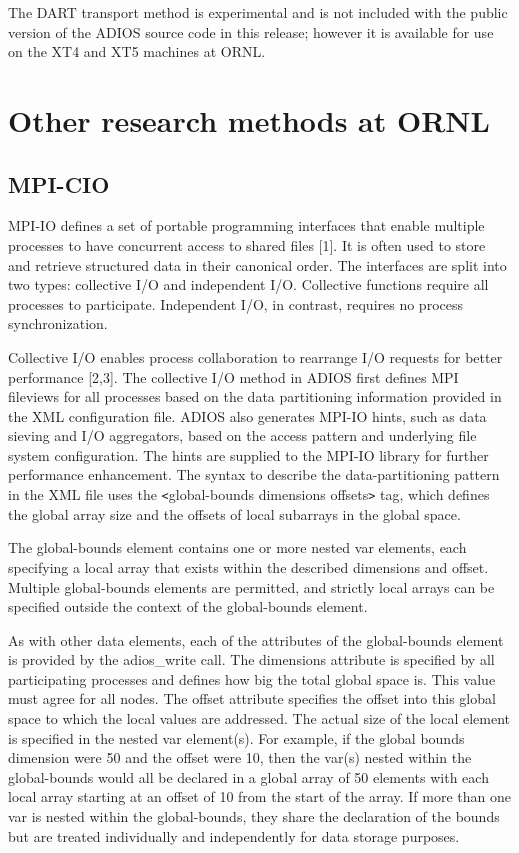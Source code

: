 The DART transport method is experimental and is not included with the public version 
of the ADIOS source code in this release; however it is available for use on the 
XT4 and XT5 machines at ORNL.

\section{Other research methods at ORNL}

\subsection{MPI-CIO}

MPI-IO defines a set of portable programming interfaces that enable multiple processes 
to have concurrent access to shared files [1]. It is often used to store and retrieve 
structured data in their canonical order. The interfaces are split into two types: 
collective I/O and independent I/O. Collective functions require all processes 
to participate. Independent I/O, in contrast, requires no process synchronization.

Collective I/O enables process collaboration to rearrange I/O requests for better 
performance [2,3]. The collective I/O method in ADIOS first defines MPI fileviews 
for all processes based on the data partitioning information provided in the XML 
configuration file. ADIOS also generates MPI-IO hints, such as data sieving and 
I/O aggregators, based on the access pattern and underlying file system configuration. 
The hints are supplied to the MPI-IO library for further performance enhancement. 
The syntax to describe the data-partitioning pattern in the XML file uses the \texttt{<}global-bounds 
dimensions offsets\texttt{>} tag, which defines the global array size and the offsets 
of local subarrays in the global space. 

The global-bounds element contains one or more nested var elements, each specifying 
a local array that exists within the described dimensions and offset.  Multiple 
global-bounds elements are permitted, and strictly local arrays can be specified 
outside the context of the global-bounds element.

As with other data elements, each of the attributes of the global-bounds element 
is provided by the adios\_write call. The dimensions attribute is specified by 
all participating processes and defines how big the total global space is.  This 
value must agree for all nodes. The offset attribute specifies the offset into 
this global space to which the local values are addressed. The actual size of the 
local element is specified in the nested var element(s).  For example, if the global 
bounds dimension were 50 and the offset were 10, then the var(s) nested within 
the global-bounds would all be declared in a global array of 50 elements with each 
local array starting at an offset of 10 from the start of the array.  If more than 
one var is nested within the global-bounds, they share the declaration of the bounds 
but are treated individually and independently for data storage purposes. 

